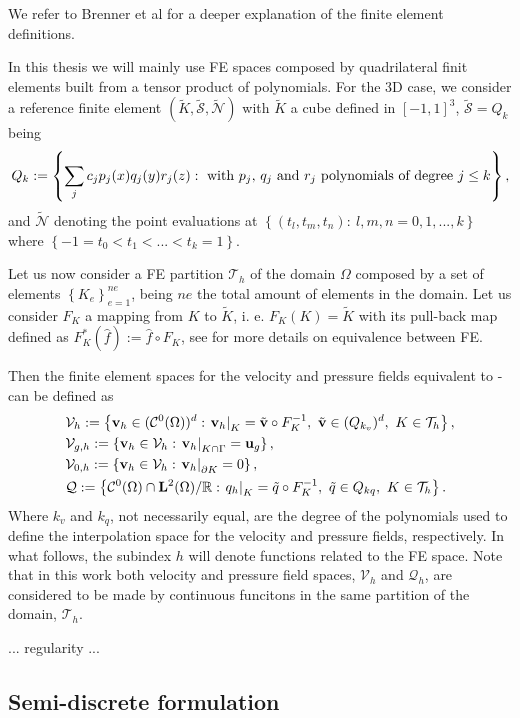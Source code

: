 We refer to Brenner et al \cite{Brenner} for a deeper explanation of the finite element definitions.

In this thesis we will mainly use FE spaces composed by quadrilateral finit elements built from a tensor product of polynomials. For the 3D case, we consider a reference finite element $ (\widetilde{K},\widetilde{\mathcal{S}},\widetilde{\mathcal{N}}) $ with $ \widetilde{K} $ a cube defined in $ [-1,1]^3 $, $ \widetilde{\mathcal{S}}=Q_k $ being
$$ Q_k:=\left\{\sum_jc_jp_j(x)q_j(y)r_j(z):\mbox{ with $ p_j $, $ q_j $ and $ r_j $ polynomials of degree $j \leq k $}\right\}, $$
and $ \widetilde{\mathcal{N}} $ denoting the point evaluations at $ \left\{(t_l,t_m,t_n):\ l,m,n=0,1,...,k \right\} $ where $\left\{-1 = t_0 < t_1 < ... < t_k = 1 \right\}$.

Let us now consider a FE partition $ \mathcal{T}_h $ of the domain $ \Omega $ composed by a set of elements $ \left\{K_e\right\}_{e=1}^{ne} $, being $ ne $ the total amount of elements in the domain. Let us consider $ F_K $ a mapping from $ K $ to $ \widetilde{K} $, i. e. $ F_K(K)=\widetilde{K} $ with its pull-back map defined as $ F^*_K(\hat{f}):=\hat{f}\circ F_K $, see \cite{Ciarlet&Raviart1972,brenner} for more details on equivalence between FE.

Then the finite element spaces for the velocity and pressure fields equivalent to - can be defined as
\begin{align}
\label{eq-C2_varia_NS_vh_space}
&\mathcal{V}_{h}:=\left\{{\bf v}_h\in(\mathcal{C}^0(\Omega))^d:\left.{\bf v}_h\right|_K=\tilde{{\bf v}}\circ F_K^{-1},\ \tilde{{\bf v}}\in(Q_{k_v})^d,\ K\in\mathcal{T}_h\right\},\\
\label{eq-C2_varia_NS_vgh_space}
&\mathcal{V}_{g,h}:=\left\{{\bf v}_h\in\mathcal{V}_h:\left.{\bf v}_h\right|_{K\cap\Gamma}={\bf u}_g\right\},\\
\label{eq-C2_varia_NS_v0h_space}
&\mathcal{V}_{0,h}:=\left\{{\bf v}_h\in\mathcal{V}_h:\left.{\bf v}_h\right|_{\partial K}=0\right\},\\
\label{eq-C2_varia_NS_qh_space}
&\mathcal{Q}:=\left\{\mathcal{C}^0(\Omega)\cap{\bf L}^2(\Omega)/\mathbb{R}:\left.q_h\right|_K=\tilde{q}\circ F_K^{-1},\ \tilde{q}\in Q_{kq},\ K\in\mathcal{T}_h \right\}.
\end{align}
Where $ k_v $ and $ k_q $, not necessarily equal, are the degree of the polynomials used to define the interpolation space for the velocity and pressure fields, respectively. In what follows, the subindex $ h $ will denote functions related to the FE space. Note that in this work both velocity and pressure field spaces, $ \mathcal{V}_h $ and $ \mathcal{Q}_h $, are considered to be made by continuous funcitons in the same partition of the domain, $ \mathcal{T}_h $.

... regularity ...

\subsection{Semi-discrete formulation}
\label{subsec-variational_semidiscrete}

